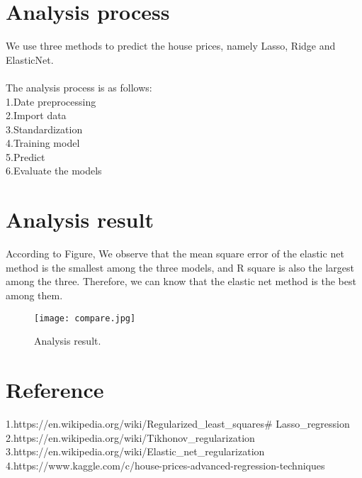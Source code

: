 \documentclass[conference]{IEEEtran}
\begin{document}
\section{Analysis process}
We use three methods to predict the house prices, namely Lasso, Ridge and ElasticNet.\\
~\\
The analysis process is as follows:\\
1.Date preprocessing\\
2.Import data\\
3.Standardization\\
4.Training model\\
5.Predict\\
6.Evaluate the models\\


\section{Analysis result}

According to Figure, We observe that the mean square error of the elastic net method is the smallest among the three models, and R square is also the largest among the three. Therefore, we can know that the elastic net method is the best among them.

\begin{figure}[htbp]
\centerline{\texttt{[image: compare.jpg]}}
\caption{Analysis result.}
\label{fig1}
\end{figure}


\section{Reference}
\begin{flushleft}
1.https://en.wikipedia.org/wiki/Regularized\_least\_squares# Lasso\_regression\\
2.https://en.wikipedia.org/wiki/Tikhonov\_regularization\\
3.https://en.wikipedia.org/wiki/Elastic\_net\_regularization\\
4.https://www.kaggle.com/c/house-prices-advanced-regression-techniques\\
\end{flushleft}
\end{document}
